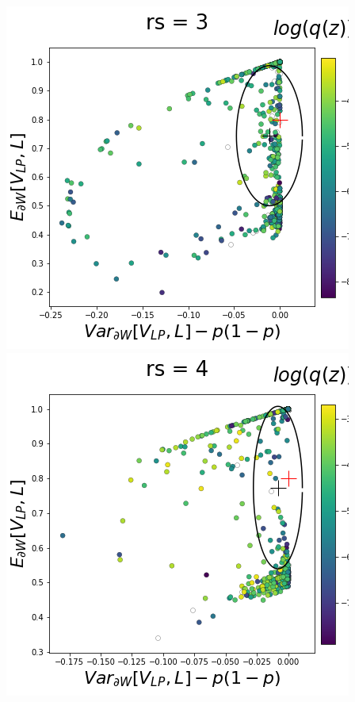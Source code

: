 \documentclass[11pt]{article}
\begin{document}
\begin{center}
\includegraphics[scale=0.33]{figs/T_x_SC_pvar_reduced_c=0_p=80_rs=3.png} \\
\includegraphics[scale=0.33]{figs/T_x_SC_pvar_reduced_c=0_p=80_rs=4.png}

\end{center}
\end{document}
